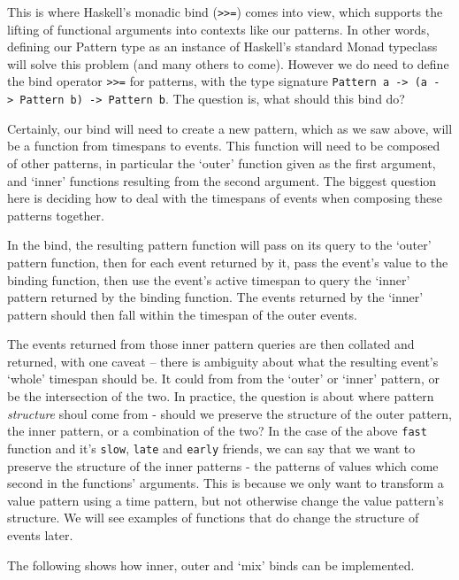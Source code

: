 \documentclass[
]{article}
\begin{document}
This is where Haskell's monadic bind
(\texttt{\textgreater{}\textgreater{}=}) comes into view, which supports
the lifting of functional arguments into contexts like our patterns. In
other words, defining our Pattern type as an instance of Haskell's
standard Monad typeclass will solve this problem (and many others to
come). However we do need to define the bind operator
\texttt{\textgreater{}\textgreater{}=} for patterns, with the type
signature
\texttt{Pattern\ a\ -\textgreater{}\ (a\ -\textgreater{}\ Pattern\ b)\ -\textgreater{}\ Pattern\ b}.
The question is, what should this bind do?

Certainly, our bind will need to create a new pattern, which as we saw
above, will be a function from timespans to events. This function will
need to be composed of other patterns, in particular the `outer'
function given as the first argument, and `inner' functions resulting
from the second argument. The biggest question here is deciding how to
deal with the timespans of events when composing these patterns
together.

In the bind, the resulting pattern function will pass on its query to
the `outer' pattern function, then for each event returned by it, pass
the event's value to the binding function, then use the event's active
timespan to query the `inner' pattern returned by the binding function.
The events returned by the `inner' pattern should then fall within the
timespan of the outer events.

The events returned from those inner pattern queries are then collated
and returned, with one caveat -- there is ambiguity about what the
resulting event's `whole' timespan should be. It could from from the
`outer' or `inner' pattern, or be the intersection of the two. In
practice, the question is about where pattern \emph{structure} shoul
come from - should we preserve the structure of the outer pattern, the
inner pattern, or a combination of the two? In the case of the above
\texttt{fast} function and it's \texttt{slow}, \texttt{late} and
\texttt{early} friends, we can say that we want to preserve the
structure of the inner patterns - the patterns of values which come
second in the functions' arguments. This is because we only want to
transform a value pattern using a time pattern, but not otherwise change
the value pattern's structure. We will see examples of functions that do
change the structure of events later.

The following shows how inner, outer and `mix' binds can be implemented.
\end{document}
